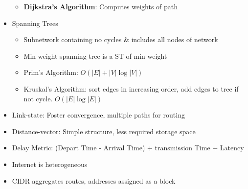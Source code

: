 \documentclass{article}
\begin{document}
\begin{itemize}
\begin{itemize}
            \item \textbf{Dijkstra's Algorithm}: Computes weights of path 
        \end{itemize}
        \item Spanning Trees
        \begin{itemize}
            \item Subnetwork containing no cycles \& includes all nodes of network
            \item Min weight spanning tree is a ST of min weight
            \item Prim's Algorithm: $O(|E|+|V|\log|V|)$
            \item Kruskal's Algorithm: sort edges in increasing order, add edges to tree if not cycle. $O(|E|\log|E|)$
        \end{itemize}
        \item Link-state: Foster convergence, multiple paths for routing
        \item Distance-vector: Simple structure, less required storage space
        \item Delay Metric: (Depart Time - Arrival Time) + transmission Time + Latency
        \item Internet is heterogeneous
        \item CIDR aggregates routes, addresses assigned as a block
    \end{itemize}
\end{document}
